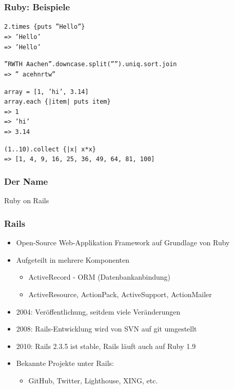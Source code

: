 \begin{frame}
  \frametitle{Ruby: Beispiele}
  {\tt \small 2.times \{puts ''Hello''\}} \\
  {\tt \small {\color{green}=> 'Hello'}} \\
  {\tt \small {\color{green}=> 'Hello'}}
  \vspace{0.5cm}
  \pause

  {\tt \small ''RWTH Aachen''.downcase.split('''').uniq.sort.join} \\
  {\tt \small  {\color{green}=> '' acehnrtw''}} \\
  \vspace{0.5cm}
  \pause

  {\tt \small array = [1, 'hi', 3.14]} \\
  {\tt \small array.each \{|item| puts item\}} \\
  {\tt \small {\color{green}=> 1}} \\
  {\tt \small {\color{green}=> 'hi'}} \\
  {\tt \small {\color{green}=> 3.14}}
  \vspace{0.5cm}
  \pause

  {\tt \small (1..10).collect \{|x| x*x\}} \\
  {\tt \small {\color{green}=> [1, 4, 9, 16, 25, 36, 49, 64, 81, 100]}}
\end{frame}

\begin{frame}
  \frametitle{Der Name}
  \begin{center}
    \Huge Ruby {\color{red}on Rails}
  \end{center}
\end{frame}

\begin{frame}
  \frametitle{Rails}
  \begin{itemize}
    \item{Open-Source Web-Applikation Framework auf Grundlage von Ruby}
    \item{Aufgeteilt in mehrere Komponenten}
    \begin{itemize}
      \item{ActiveRecord - ORM (Datenbankanbindung)}
      \item{ActiveResource, ActionPack, ActiveSupport, ActionMailer}
    \end{itemize}
    \vspace{0.3cm}

    \item{2004: Veröffentlichung, seitdem viele Veränderungen}
    \item{2008: Rails-Entwicklung wird von SVN auf git umgestellt}
    \item{2010: Rails 2.3.5 ist stable, Rails läuft auch auf Ruby 1.9}
    \vspace{0.3cm}

    \item{Bekannte Projekte unter Rails:}
    \begin{itemize}
      \item{GitHub, Twitter, Lighthouse, XING, etc.}
    \end{itemize}
  \end{itemize}
\end{frame}

